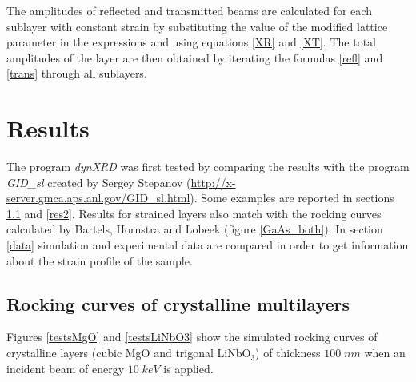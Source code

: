 \documentclass[12pt,oneside,notitlepage,abstracton,a4paper]{scrartcl}
\begin{document}
The amplitudes of reflected and transmitted beams are calculated for each sublayer with constant strain by substituting the value of the modified lattice parameter in the expressions and using equations \ref{XR} and \ref{XT}. The total amplitudes of the layer are then obtained by iterating the formulas \ref{refl} and \ref{trans} through all sublayers.




\section{Results}

The program \textit{dynXRD} was first tested by comparing the results with the program \textit{GID\_sl} created by Sergey Stepanov (\url{http://x-server.gmca.aps.anl.gov/GID_sl.html}). Some examples are reported in sections \ref{res1} and \ref{res2}. Results for strained layers also match with the rocking curves calculated by Bartels, Hornstra and Lobeek \cite{Bartels:a25435} (figure \ref{GaAs_both}). In section \ref{data} simulation and experimental data are compared in order to get information about the strain profile of the sample.


\subsection{Rocking curves of crystalline multilayers}\label{res1}
Figures \ref{testsMgO} and \ref{testsLiNbO3} show the simulated rocking curves of crystalline layers (cubic MgO and trigonal LiNbO$ _3$) of thickness $100\;nm$ when an incident beam of energy $10\; keV$ is applied. 
\end{document}
